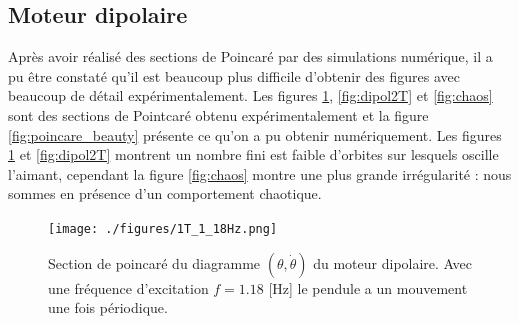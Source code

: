 \documentclass[a4paper,12pt,oneside]{article}
\begin{document}




















\subsection{Moteur dipolaire}

Après avoir réalisé des sections de Poincaré par des simulations numérique, il a pu être constaté qu'il est beaucoup plus difficile d'obtenir des figures avec beaucoup de détail expérimentalement. Les figures \ref{fig:dipol1T}, \ref{fig:dipol2T} et \ref{fig:chaos} sont des sections de Pointcaré obtenu expérimentalement et la figure \ref{fig:poincare_beauty} présente ce qu'on a pu obtenir numériquement. Les figures \ref{fig:dipol1T} et \ref{fig:dipol2T} montrent un nombre fini est faible d'orbites sur lesquels oscille l'aimant, cependant la figure \ref{fig:chaos} montre une plus grande irrégularité : nous sommes en présence d'un comportement chaotique.






\begin{figure}[h!]
  \begin{center}
  \texttt{[image: ./figures/1T\_1\_18Hz.png]}
  \caption{Section de poincaré du diagramme $(\theta,\dot{\theta})$ du moteur dipolaire. Avec une fréquence d'excitation $f=1.18$ [Hz] le pendule a un mouvement une fois périodique.} \label{fig:dipol1T}
  \end{center}
\end{figure}
\end{document}
